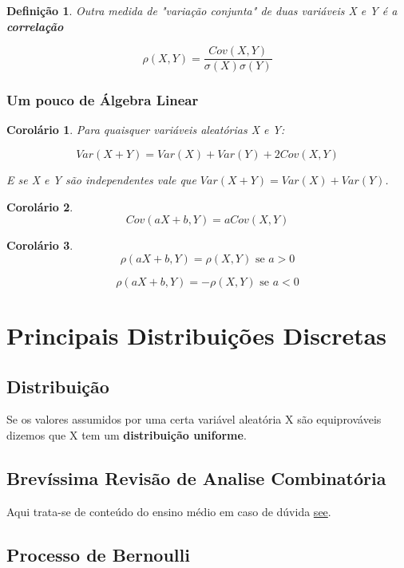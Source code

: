 \documentclass[12pt]{article}
\newtheorem{corollary}{Corolário}[theorem]
\newtheorem{definition}{Definição}
\begin{document}
\begin{definition}
    Outra medida de "variação conjunta" de duas variáveis X e Y é a \textbf{correlação}
    
    $$\rho (X, Y) = \dfrac{Cov (X, Y)}{\sigma (X) \sigma(Y)}$$
\end{definition}

\subsubsection*{Um pouco de Álgebra Linear}
\begin{corollary}
    Para quaisquer variáveis aleatórias X e Y:
    
    $$Var(X + Y) = Var(X) + Var(Y) + 2 Cov (X, Y)$$
    
    E se X e Y são independentes vale que $Var(X + Y) = Var(X) + Var(Y)$.
\end{corollary}

\begin{corollary}
    $$Cov (aX + b, Y) = a Cov (X, Y)$$
\end{corollary}

\begin{corollary}
    $$\rho (a X + b, Y) = \rho (X, Y) \text{ se } a > 0$$
    
    $$\rho (a X + b, Y) = - \rho (X, Y) \text{ se } a < 0$$
\end{corollary}

\section{Principais Distribuições Discretas}
\subsection{Distribuição}
Se os valores assumidos por uma certa variável aleatória X são equiprováveis dizemos que X tem um \textbf{distribuição uniforme}.

\subsection{Brevíssima Revisão de Analise Combinatória}
Aqui trata-se de conteúdo do ensino médio em caso de dúvida \href{https://pt.wikipedia.org/wiki/Combinat\%C3\%B3ria}{see}.

\subsection{Processo de Bernoulli}
\end{document}
